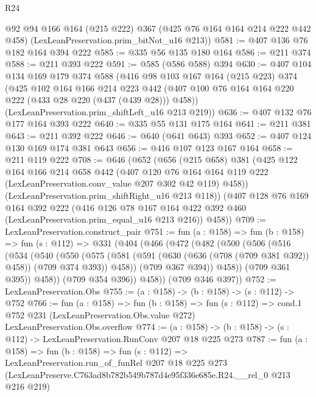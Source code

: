 \begin{lexlean}{R24}
\begin{coremodule}
      @92
      @94
      @166
      @164
      (@215 @222)
      @367
      (@425 @76 @164 @164 @214 @222 @442 @458)
      (LexLeanPreservation.prim_bitNot_u16 @213))
@581 := @407 @136 @76 @182 @164 @394 @222
@585 := @335 @56 @135 @180 @164
@586 := @211 @374
@588 := @211 @393 @222
@591 := @585 (@586 @588) @394
@630 := @407
    @104
    @134
    @169
    @179
    @374
    @588
    (@416
      @98
      @103
      @167
      @164
      (@215 @223)
      @374
      (@425
        @102
        @164
        @166
        @214
        @223
        @442
        (@407 @100 @76 @164 @164 @220 @222 (@433 @28 @220 (@437 (@439 @28))) @458))
      (LexLeanPreservation.prim_shiftLeft_u16 @213 @219))
@636 := @407 @132 @76 @177 @164 @393 @222
@640 := @335 @55 @131 @175 @164
@641 := @211 @381
@643 := @211 @392 @222
@646 := @640 (@641 @643) @393
@652 := @407 @124 @130 @169 @174 @381 @643
@656 := @416 @107 @123 @167 @164
@658 := @211 @119 @222
@708 := @646
    (@652
      (@656
        (@215 @658)
        @381
        (@425
          @122
          @164
          @166
          @214
          @658
          @442
          (@407
            @120
            @76
            @164
            @164
            @119
            @222
            (LexLeanPreservation.conv_value @207 @302 @42 @119)
            @458))
        (LexLeanPreservation.prim_shiftRight_u16 @213 @118))
      (@407
        @128
        @76
        @169
        @164
        @392
        @222
        (@416 @126 @78 @167 @164 @422 @392 @460 (LexLeanPreservation.prim_equal_u16 @213 @216))
        @458))
@709 := LexLeanPreservation.construct_pair
@751 := fun (a : @158) =>
  fun (b : @158) =>
  fun (s : @112) =>
  @331
    (@404
      (@466
        (@472
          (@482
            (@500
              (@506
                (@516
                  (@534
                    (@540
                      (@550
                        (@575
                          (@581
                            (@591 (@630 (@636 (@708 (@709 @381 @392)) @458)) (@709 @374 @393))
                            @458))
                        (@709 @367 @394))
                      @458))
                  (@709 @361 @395))
                @458))
            (@709 @354 @396))
          @458))
      (@709 @346 @397))
@752 := LexLeanPreservation.Obs
@755 := (a : @158) -> (b : @158) -> (s : @112) -> @752
@766 := fun (a : @158) =>
  fun (b : @158) =>
  fun (s : @112) =>
  cond.{1} @752 @231 (LexLeanPreservation.Obs.value @272) LexLeanPreservation.Obs.overflow
@774 := (a : @158) -> (b : @158) -> (s : @112) -> LexLeanPreservation.RunConv @207 @18 @225 @273
@787 := fun (a : @158) =>
  fun (b : @158) =>
  fun (s : @112) =>
  LexLeanPreservation.run_of_funRel
    @207
    @18
    @225
    @273
    (LexLeanPreserve.C763ad8b782b549b787d4e95f336e685e.R24.__rel_0 @213 @216 @219)
\end{coremodule}
\end{lexlean}
